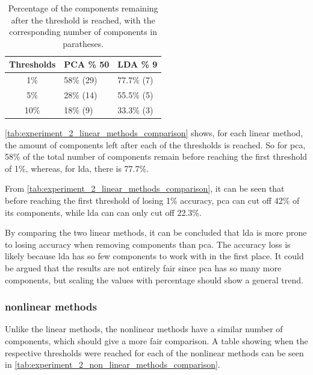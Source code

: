 \begin{table}[htb!]
    \centering
    \begin{tabular}{cp{}p{}}
        \toprule
        \textbf{Thresholds} & \textbf{PCA \% 50} & \textbf{LDA \% 9} \\
        \midrule
        1\%                 & 58\% (29)          & 77.7\% (7)        \\
        5\%                 & 28\% (14)          & 55.5\% (5)        \\
        10\%                & 18\% (9)           & 33.3\% (3)        \\
        \bottomrule
    \end{tabular}
    \caption{Percentage of the components remaining after the threshold is reached, with the corresponding number of components in paratheses.}
    \label{tab:experiment_2_linear_methods_comparison}
\end{table}

\autoref{tab:experiment_2_linear_methods_comparison} shows, for each linear method, the amount of components left after each of the thresholds is reached. So for \gls{pca}, 58\% of the total number of components remain before reaching the first threshold of 1\%, whereas, for \gls{lda}, there is 77.7\%.

From \autoref{tab:experiment_2_linear_methods_comparison}, it can be seen that before reaching the first threshold of losing 1\% accuracy, \gls{pca} can cut off 42\% of its components, while \gls{lda} can can only cut off 22.3\%.

By comparing the two linear methods, it can be concluded that \gls{lda} is more prone to losing accuracy when removing components than \gls{pca}. The accuracy loss is likely because \gls{lda} has so few components to work with in the first place. It could be argued that the results are not entirely fair since \gls{pca} has so many more components, but scaling the values with percentage should show a general trend.


\subsubsection{nonlinear methods}
Unlike the linear methods, the nonlinear methods have a similar number of components, which should give a more fair comparison. A table showing when the respective thresholds were reached for each of the nonlinear methods can be seen in \autoref{tab:experiment_2_non_linear_methods_comparison}.

